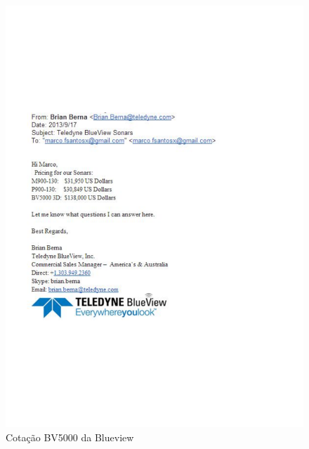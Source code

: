 \begin{figure}[h!]
 \centering
 \includegraphics[width=1\columnwidth]{Seaking_profiler/price_quote_2.pdf}
 \caption{Cotação BV5000 da Blueview}
  
\end{figure}





